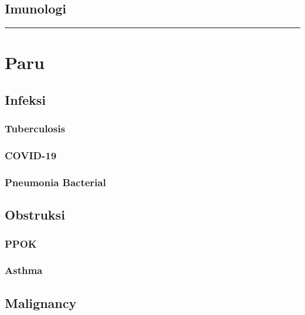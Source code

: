 \documentclass[
]{book}
\begin{document}
\hypertarget{imunologi}{%
\subsection{Imunologi}\label{imunologi}}

\begin{center}\rule{0.5\linewidth}{0.5pt}\end{center}

\hypertarget{paru}{%
\section{Paru}\label{paru}}

\hypertarget{infeksi-1}{%
\subsection{Infeksi}\label{infeksi-1}}

\hypertarget{tuberculosis}{%
\subsubsection{Tuberculosis}\label{tuberculosis}}

\hypertarget{covid-19}{%
\subsubsection{COVID-19}\label{covid-19}}

\hypertarget{pneumonia-bacterial}{%
\subsubsection{Pneumonia Bacterial}\label{pneumonia-bacterial}}

\hypertarget{obstruksi}{%
\subsection{Obstruksi}\label{obstruksi}}

\hypertarget{ppok}{%
\subsubsection{PPOK}\label{ppok}}

\hypertarget{asthma}{%
\subsubsection{Asthma}\label{asthma}}

\hypertarget{malignancy}{%
\subsection{Malignancy}\label{malignancy}}
\end{document}
